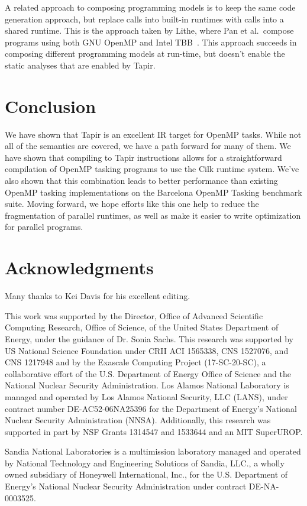 \documentclass[sigconf]{acmart}
\begin{document}
A related approach to composing programming models is to keep the same code
generation approach, but replace calls into built-in runtimes with calls into a
shared runtime. This is the approach taken by Lithe, where Pan et
al.\ compose programs using both GNU OpenMP and Intel TBB~\cite{lithe}. This approach succeeds
in composing different programming models at run-time, but doesn't enable the
static analyses that are enabled by Tapir.

\section{Conclusion} \label{Sec:Conclusion}
We have shown that Tapir is an excellent IR target for OpenMP tasks. While not
all of the semantics are covered, we have a path forward for many of them. We have
shown that compiling to Tapir instructions allows for a straightforward compilation of
OpenMP tasking programs to use the Cilk runtime system. We've also shown that this
combination leads to better performance than existing OpenMP tasking implementations
on the Barcelona OpenMP Tasking benchmark suite. Moving forward, we hope efforts like
this one help to reduce the fragmentation of parallel runtimes, as well as make
it easier to write optimization for parallel programs.

\section*{Acknowledgments}
Many thanks to Kei Davis for his excellent editing.

This work was supported by the Director, Office of Advanced Scientific
Computing Research, Office of Science, of the United States Department
of Energy, under the guidance of Dr. Sonia Sachs. This research was
supported by US National Science Foundation under CRII ACI 1565338,
CNS 1527076, and CNS 1217948 and by the Exascale Computing Project
(17-SC-20-SC), a collaborative effort of the U.S. Department of Energy
Office of Science and the National Nuclear Security Administration.
Los Alamos National Laboratory is managed and operated by Los Alamos
National Security, LLC (LANS), under contract number DE-AC52-06NA25396
for the Department of Energy's National Nuclear Security
Administration (NNSA). Additionally, this research was supported in
part by NSF Grants 1314547 and 1533644 and an MIT SuperUROP.

Sandia National Laboratories is a multimission laboratory managed and
operated by National Technology and Engineering Solutions of Sandia,
LLC., a wholly owned subsidiary of Honeywell International, Inc., for
the U.S. Department of Energy's National Nuclear Security
Administration under contract DE-NA-0003525.



\end{document}
